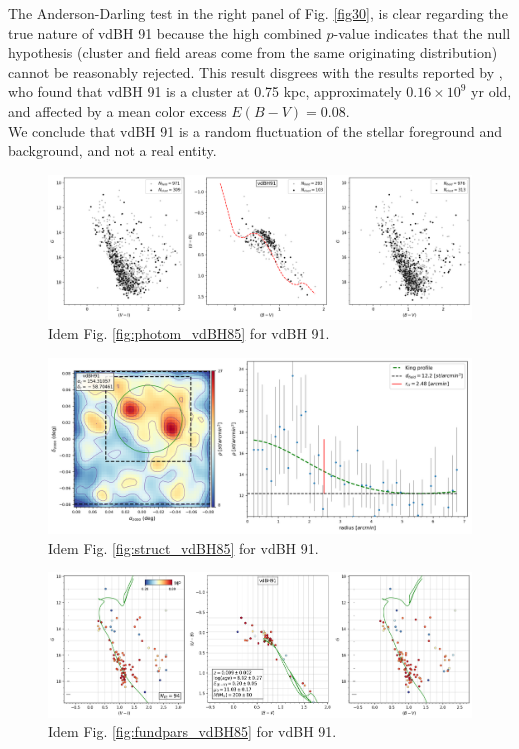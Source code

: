 \documentclass[draft]{aa}
\begin{document}
The Anderson-Darling test in the right panel of Fig. \ref{fig30}, is clear regarding
the true nature of vdBH 91 because the high combined $p$-value
indicates that the null hypothesis (cluster and field areas come from the same
originating distribution) cannot be reasonably rejected. This result disgrees with the results
reported by \cite{Kharchenko_2005}, who found that vdBH 91
is a cluster at 0.75 kpc, approximately $0.16\times10^9$ yr old, and affected by
a mean color excess $E(B-V)=0.08$.\\

We conclude that vdBH 91 is a random fluctuation of the stellar
foreground and background, and not a real entity.

\begin{figure}[ht]
    \centering
    \includegraphics[width=\hsize]{../figs/obs_vdBH91.png}
    \caption{Idem Fig. \ref{fig:photom_vdBH85} for vdBH 91.}
    \label{fig27}
\end{figure}
\begin{figure}[ht]
    \centering
    \includegraphics[width=\hsize]{../figs/dmap_vdbh91.png}
    \caption{Idem Fig. \ref{fig:struct_vdBH85} for vdBH 91.}
    \label{fig28}
\end{figure}
\begin{figure}[ht]
    \centering
    \includegraphics[width=\hsize]{../figs/cmds_vdBH91.png}
    \caption{Idem Fig. \ref{fig:fundpars_vdBH85} for vdBH 91.}
    \label{fig29}
\end{figure}
\end{document}
